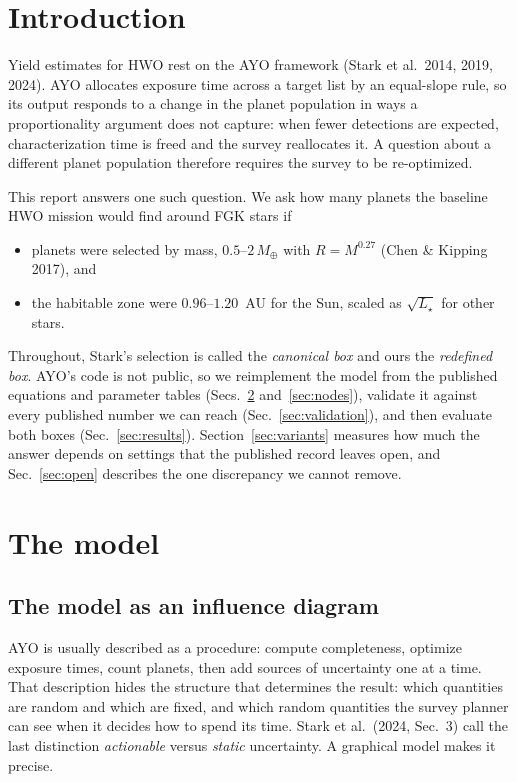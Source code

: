 \documentclass[11pt,a4paper]{article}
\begin{document}
\tableofcontents

\section{Introduction}
\label{sec:intro}

Yield estimates for HWO rest on the AYO framework (Stark et al.\ 2014, 2019, 2024). AYO allocates
exposure time across a target list by an equal-slope rule, so its output responds to a change in
the planet population in ways a proportionality argument does not capture: when fewer detections
are expected, characterization time is freed and the survey reallocates it. A question about a
different planet population therefore requires the survey to be re-optimized.

This report answers one such question. We ask how many planets the baseline HWO mission would find
around FGK stars if
\begin{itemize}
\item planets were selected by mass, $0.5$--$2\,M_\oplus$ with $R = M^{0.27}$ (Chen \& Kipping
2017), and
\item the habitable zone were $0.96$--$1.20$~AU for the Sun, scaled as $\sqrt{L_\star}$ for other
stars.
\end{itemize}
Throughout, Stark's selection is called the \emph{canonical box} and ours the \emph{redefined
box}. AYO's code is not public, so we reimplement the model from the published equations and
parameter tables (Secs.~\ref{sec:model} and~\ref{sec:nodes}), validate it against every published
number we can reach (Sec.~\ref{sec:validation}), and then evaluate both boxes
(Sec.~\ref{sec:results}). Section~\ref{sec:variants} measures how much the answer depends on
settings that the published record leaves open, and Sec.~\ref{sec:open} describes the one
discrepancy we cannot remove.

\section{The model}
\label{sec:model}

\subsection{The model as an influence diagram}

AYO is usually described as a procedure: compute completeness, optimize exposure times, count
planets, then add sources of uncertainty one at a time. That description hides the structure that
determines the result: which quantities are random and which are fixed, and which random
quantities the survey planner can see when it decides how to spend its time. Stark et al.\ (2024,
Sec.~3) call the last distinction \emph{actionable} versus \emph{static} uncertainty. A graphical
model makes it precise.
\end{document}
